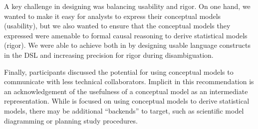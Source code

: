 A key challenge in designing \rTisane was balancing usability and rigor. On one
hand, we wanted to make it easy for analysts to express their conceptual models
(usability), but we also wanted to ensure that the conceptual models they
expressed were amenable to formal causal reasoning to derive statistical models
(rigor). We were able to achieve both in \rTisane by designing usable language
constructs in the DSL and increasing precision for rigor during disambiguation.

Finally, participants discussed the potential for using conceptual models to
communicate with less technical collaborators. Implicit in this recommendation
is an acknowledgement of the usefulness of a conceptual model as an intermediate
representation. While \rTisane is focused on using conceptual models to derive
statistical models, there may be additional ``backends'' to target, such as
scientific model diagramming or planning study procedures. 



